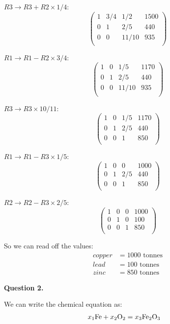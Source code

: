 \documentclass[12pt,a4paper]{report}
\begin{document}
\( R3 \rightarrow R3 + R2 \times 1/4 \):
 \[
 \left(\begin{array}{rrr|r}
   1   & 3/4  & 1/2  & 1500  \\
   0   & 1    & 2/5  & 440  \\
   0   & 0    & 11/10& 935  \\ 
   \end{array} \right)
\]

\( R1 \rightarrow R1 - R2 \times 3/4 \):
 \[
 \left(\begin{array}{rrr|r}
   1   & 0    & 1/5  & 1170  \\
   0   & 1    & 2/5  & 440  \\
   0   & 0    & 11/10& 935  \\ 
   \end{array} \right)
\]

\( R3 \rightarrow R3 \times 10/11 \):
 \[
 \left(\begin{array}{rrr|r}
   1   & 0    & 1/5  & 1170  \\
   0   & 1    & 2/5  & 440  \\
   0   & 0    & 1    & 850  \\ 
   \end{array} \right)
\]

\( R1 \rightarrow R1 - R3 \times 1/5 \):
 \[
 \left(\begin{array}{rrr|r}
   1   & 0    & 0    & 1000  \\
   0   & 1    & 2/5  & 440  \\
   0   & 0    & 1    & 850  \\ 
   \end{array} \right)
\]

\( R2 \rightarrow R2 - R3 \times 2/5 \):
 \[
 \left(\begin{array}{rrr|r}
   1   & 0    & 0    & 1000  \\
   0   & 1    & 0    & 100  \\
   0   & 0    & 1    & 850  \\ 
   \end{array} \right)
\]

So we can read off the values:
\begin{align*}
 copper &= 1000\text{ tonnes} \\
 lead   &= 100\text{ tonnes} \\
 zinc   &= 850\text{ tonnes}
\end{align*} 


\textbf{Question 2.}

We can write the chemical equation as:
\begin{align*}
 x_1\text{Fe} + x_2\text{O\textsubscript{2}} &= x_3\text{Fe\textsubscript{2}O\textsubscript{3}}
\end{align*} 
\end{document}
